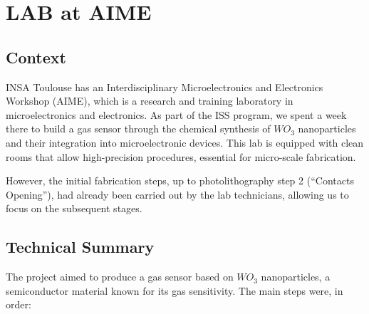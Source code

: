 

\section{LAB at AIME}

\subsection{Context}

\indent \indent INSA Toulouse has an Interdisciplinary Microelectronics and Electronics Workshop (AIME), which is a research and training laboratory in microelectronics and electronics. As part of the ISS program, we spent a week there to build a gas sensor through the chemical synthesis of $WO_3$ nanoparticles and their integration into microelectronic devices. This lab is equipped with clean rooms that allow high-precision procedures, essential for micro-scale fabrication.

However, the initial fabrication steps, up to photolithography step 2 (“Contacts Opening”), had already been carried out by the lab technicians, allowing us to focus on the subsequent stages.

\subsection{Technical Summary}

The project aimed to produce a gas sensor based on $WO_3$ nanoparticles, a semiconductor material known for its gas sensitivity. The main steps were, in order:

